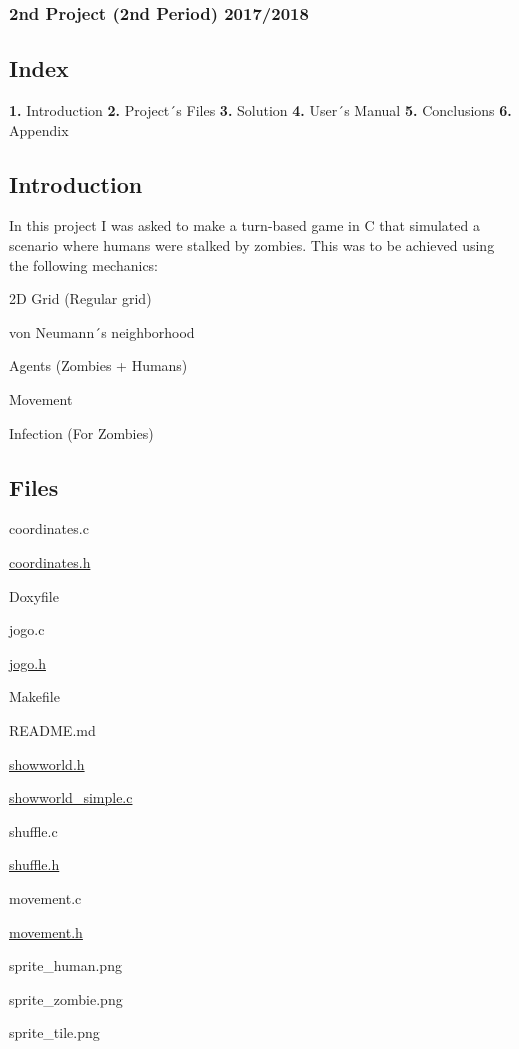 \subsubsection*{2nd Project (2nd Period) 2017/2018}

\subsection*{Index}

{\bfseries 1.} Introduction {\bfseries 2.} Project´s Files {\bfseries 3.} Solution {\bfseries 4.} User´s Manual {\bfseries 5.} Conclusions {\bfseries 6.} Appendix

\subsection*{Introduction}

In this project I was asked to make a turn-\/based game in C that simulated a scenario where humans were stalked by zombies. This was to be achieved using the following mechanics\+:


\begin{DoxyItemize}
\item 2D Grid (Regular grid)
\item von Neumann´s neighborhood
\item Agents (Zombies + Humans)
\item Movement
\item Infection (For Zombies)
\end{DoxyItemize}

\subsection*{Files}


\begin{DoxyItemize}
\item coordinates.\+c
\item \mbox{\hyperlink{coordinates_8h_source}{coordinates.\+h}}
\item Doxyfile
\item jogo.\+c
\item \mbox{\hyperlink{jogo_8h}{jogo.\+h}}
\item Makefile
\item R\+E\+A\+D\+M\+E.\+md
\item \mbox{\hyperlink{showworld_8h}{showworld.\+h}}
\item \mbox{\hyperlink{showworld__simple_8c}{showworld\+\_\+simple.\+c}}
\item shuffle.\+c
\item \mbox{\hyperlink{shuffle_8h_source}{shuffle.\+h}}
\item movement.\+c
\item \mbox{\hyperlink{movement_8h_source}{movement.\+h}}
\item sprite\+\_\+human.\+png
\item sprite\+\_\+zombie.\+png
\item sprite\+\_\+tile.\+png
\end{DoxyItemize}


